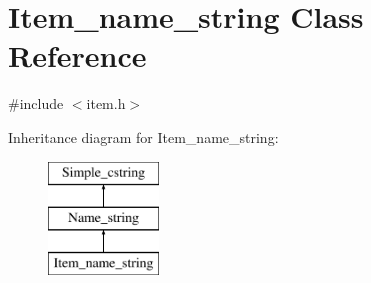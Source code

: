 \hypertarget{classItem__name__string}{}\section{Item\+\_\+name\+\_\+string Class Reference}
\label{classItem__name__string}


{\ttfamily \#include $<$item.\+h$>$}

Inheritance diagram for Item\+\_\+name\+\_\+string\+:\begin{figure}[H]
\begin{center}
\leavevmode
\includegraphics[height=3.000000cm]{classItem__name__string}
\end{center}
\end{figure}
